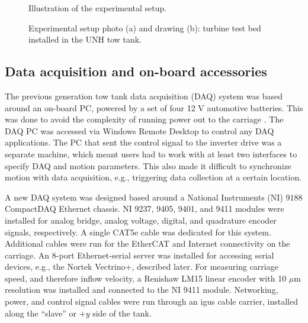 \begin{figure}[ht]
    \centering
    \caption{Illustration of the experimental setup.}
    \label{fig:exp-setup}
\end{figure}


\begin{figure}[ht]
    \centering
    
    
    \caption{Experimental setup photo (a) and drawing (b): turbine test bed
        installed in the UNH tow tank.}
    
    \label{fig:exp-setup}
\end{figure}




\subsection{Data acquisition and on-board accessories}

The previous generation tow tank data acquisition (DAQ) system was based around
an on-board PC, powered by a set of four 12 V automotive batteries. This was
done to avoid the complexity of running power out to the carriage
\cite{Darnell1996}. The DAQ PC was accessed via Windows Remote Desktop to
control any DAQ applications. The PC that sent the control signal to the
inverter drive was a separate machine, which meant users had to work with at
least two interfaces to specify DAQ and motion parameters. This also made it
difficult to synchronize motion with data acquisition, e.g., triggering data
collection at a certain location.

A new DAQ system was designed based around a National Instruments (NI) 9188
CompactDAQ Ethernet chassis. NI 9237, 9405, 9401, and 9411 modules were
installed for analog bridge, analog voltage, digital, and quadrature encoder
signals, respectively. A single CAT5e cable was dedicated for this system.
Additional cables were run for the EtherCAT and Internet connectivity on the
carriage. An 8-port Ethernet-serial server was installed for accessing serial
devices, e.g., the Nortek Vectrino+, described later. For measuring carriage
speed, and therefore inflow velocity, a Renishaw LM15 linear encoder with 10
$\mu$m resolution was installed and connected to the NI 9411 module. Networking,
power, and control signal cables were run through an igus cable carrier,
installed along the ``slave'' or $+y$ side of the tank.

